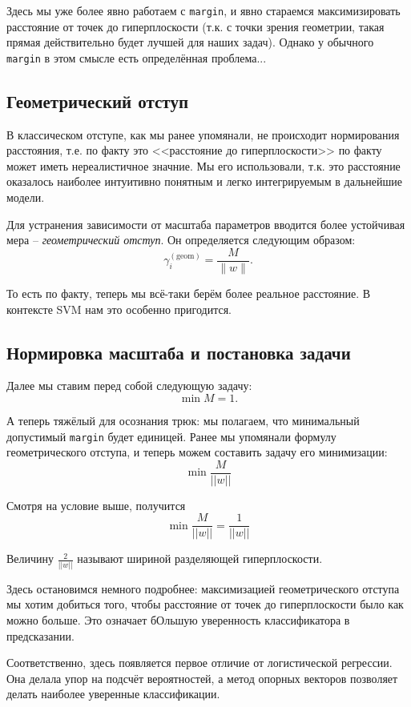 Здесь мы уже более явно работаем с \texttt{margin}, и явно стараемся максимизировать расстояние от точек до гиперплоскости (т.к. с точки зрения геометрии, такая прямая действительно будет лучшей для наших задач). Однако у обычного \texttt{margin} в этом смысле есть определённая проблема...

\subsection*{Геометрический отступ}

В классическом отступе, как мы ранее упомянали, не происходит нормирования расстояния, т.е. по факту это <<расстояние до гиперплоскости>> по факту может иметь нереалистичное значние. Мы его использовали, т.к. это расстояние оказалось наиболее интуитивно понятным и легко интегрируемым в дальнейшие модели. 

Для устранения зависимости от масштаба параметров вводится более устойчивая мера -- \emph{геометрический отступ}. Он определяется следующим образом:
\[
\gamma_i^{(\mathrm{geom})} = \frac{M}{\|w\|}.
\]

То есть по факту, теперь мы всё-таки берём более реальное расстояние. В контексте SVM нам это особенно пригодится.

\subsection*{Нормировка масштаба и постановка задачи}

Далее мы ставим перед собой следующую задачу:
\[
\min M = 1.
\]

А теперь тяжёлый для осознания трюк: мы полагаем, что минимальный допустимый \texttt{margin} будет единицей. Ранее мы упомянали формулу геометрического отступа, и теперь можем составить задачу его минимизации:
\[
\min \frac{ M  }{||w||}
\]

Смотря на условие выше, получится
\[
\min\frac{ M }{ ||w|| } = \frac{ 1 }{ ||w|| }
\]

Величину $\frac{ 2 }{ ||w|| }$ называют шириной разделяющей гиперплоскости.

Здесь остановимся немного подробнее: максимизацией геометрического отступа мы хотим добиться того, чтобы расстояние от точек до гиперплоскости было как можно больше. Это означает бОльшую уверенность классификатора в предсказании. 

Соответственно, здесь появляется первое отличие от логистической регрессии. Она делала упор на подсчёт вероятностей, а метод опорных векторов позволяет делать наиболее уверенные классификации.

